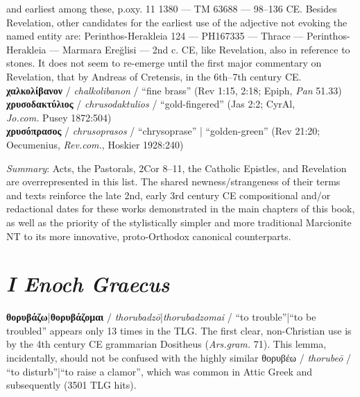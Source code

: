 \begin{small}
{and earliest among these, p.oxy. 11 1380 — TM 63688 — 98--136 CE. %
Besides Revelation, other candidates for the earliest use of the adjective not evoking the named entity are: %
Perinthos-Herakleia 124 — PH167335 — Thrace — Perinthos-Herakleia — Marmara Ereğlisi — 2nd c. CE, %
like Revelation, also in reference to stones. %
It does not seem to re-emerge until the first major commentary on Revelation, %
that by Andreas of Cretensis, in the 6th--7th century CE.} \\[0.4mm] %
\noindent{}\textbf{χαλκολίβανον} / \textit{chalkolibanon} / “fine brass” (Rev 1:15, 2:18; Epiph, \textit{Pan} 51.33) \\[0.4mm] %
\noindent{}\textbf{χρυσοδακτύλιος} / \textit{chrusodaktulios} / “gold-fingered” (Jas 2:2; CyrAl, \\\makebox[3em][l]{}\textit{Jo.com.} Pusey 1872:504) \\[0.4mm] %
\noindent{}\textbf{χρυσόπρασος} / \textit{chrusoprasos} / “chrysoprase” | “golden-green” (Rev 21:20; \\\makebox[3em][l]{}Oecumenius, \textit{Rev.com.}, Hoskier 1928:240) \\[0.4mm] %

\end{small} 

\noindent{}\textit{Summary}: Acts, the Pastorals, 2Cor 8--11, the Catholic Epistles, and Revelation are overrepresented in this list. %
The shared newness/strangeness of their terms and texts reinforce the late 2nd, early 3rd century CE compositional and/or redactional dates for these works %
demonstrated in the main chapters of this book, as well as the priority of the stylistically simpler and more traditional Marcionite NT to its more innovative, proto-Orthodox canonical counterparts. \\[1mm] %

\section{\textit{I Enoch Graecus}}

\noindent{}\textbf{θορυβάζω}|\textbf{θορυβάζομαι} / \textit{thorubadzō}|\textit{thorubadzomai} %
/ “to trouble”|“to be troubled” appears only 13 times in the TLG. %
The first clear, non-Christian use is by the 4th century CE %
grammarian Dositheus (\textit{Ars.gram.} 71). This lemma, incidentally, should not be confused %
with the highly similar θορυβέω / \textit{thorubeō} / “to disturb”|“to raise a clamor”, %
which was common in Attic Greek and subsequently (3501 TLG hits). %

